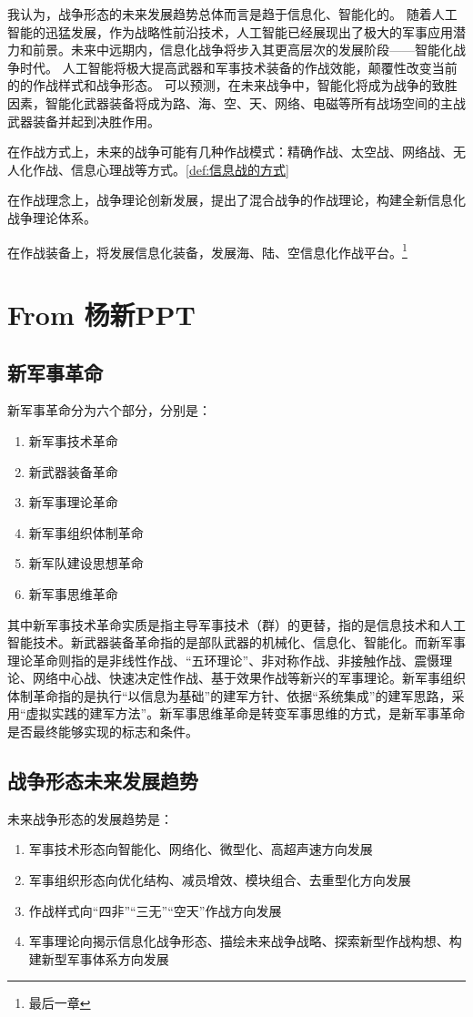 \documentclass[lang=cn,newtx,12pt,scheme=chinese]{elegantbook}
\begin{document}
我认为，战争形态的未来发展趋势总体而言是趋于信息化、智能化的。
随着人工智能的迅猛发展，作为战略性前沿技术，人工智能已经展现出了极大的军事应用潜力和前景。未来中远期内，信息化战争将步入其更高层次的发展阶段——智能化战争时代。
人工智能将极大提高武器和军事技术装备的作战效能，颠覆性改变当前的的作战样式和战争形态。
可以预测，在未来战争中，智能化将成为战争的致胜因素，智能化武器装备将成为路、海、空、天、网络、电磁等所有战场空间的主战武器装备并起到决胜作用。

在作战方式上，未来的战争可能有几种作战模式：精确作战、太空战、网络战、无人化作战、信息心理战等方式。\ref{def:信息战的方式}

在作战理念上，战争理论创新发展，提出了混合战争的作战理论，构建全新信息化战争理论体系。

在作战装备上，将发展信息化装备，发展海、陆、空信息化作战平台。\footnote{最后一章}

\section{From 杨新PPT}
\subsection{新军事革命}
新军事革命分为六个部分，分别是：
\begin{enumerate}
  \item 新军事技术革命
  \item 新武器装备革命 
  \item 新军事理论革命
  \item 新军事组织体制革命 
  \item 新军队建设思想革命
  \item 新军事思维革命
\end{enumerate}

其中新军事技术革命实质是指主导军事技术（群）的更替，指的是信息技术和人工智能技术。新武器装备革命指的是部队武器的机械化、信息化、智能化。而新军事理论革命则指的是非线性作战、“五环理论”、非对称作战、非接触作战、震慑理论、网络中心战、快速决定性作战、基于效果作战等新兴的军事理论。新军事组织体制革命指的是执行“以信息为基础”的建军方针、依据“系统集成”的建军思路，采用“虚拟实践的建军方法”。新军事思维革命是转变军事思维的方式，是新军事革命是否最终能够实现的标志和条件。

\subsection{战争形态未来发展趋势}
未来战争形态的发展趋势是：
\begin{enumerate}
  \item 军事技术形态向智能化、网络化、微型化、高超声速方向发展
  \item 军事组织形态向优化结构、减员增效、模块组合、去重型化方向发展
  \item 作战样式向“四非”“三无”“空天”作战方向发展
  \item 军事理论向揭示信息化战争形态、描绘未来战争战略、探索新型作战构想、构建新型军事体系方向发展
\end{enumerate}
\end{document}
